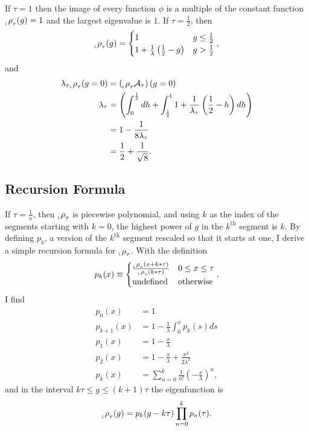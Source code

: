\documentclass[12pt]{article} \usepackage{amsmath,amsfonts}
\newcommand{\Aop}{{\cal A}}
\newcommand{\function}{\phi}
\newcommand{\leftfunction}{{_{_{\scalebox{.4}{L}}} \rho}}
\renewcommand{\th}{^{\text{th}}}
\begin{document}
If $\tau = 1$ then the image of every function $\function$ is a
multiple of the constant function $\leftfunction_\tau(g) = 1$ and the
largest eigenvalue is $1$.  If $\tau = \frac{1}{2}$, then
\begin{equation*}
  \leftfunction_\tau(g) =
  \begin{cases}
    1 & g \leq \frac{1}{2} \\
    1 + \frac{1}{\lambda}\left( \frac{1}{2} - g \right) & g > \frac{1}{2}
  \end{cases},
\end{equation*}
and
\begin{align*}
  \lambda_\tau \leftfunction_\tau (g=0) &= \left( \leftfunction_\tau
                                          \Aop_\tau \right) (g=0) \\ 
  \lambda_\tau &= \left( \int_0^{\frac{1}{2}} dh + \int_{\frac{1}{2}}^1
                1 + \frac{1}{\lambda_\tau}\left( \frac{1}{2} - h \right)
                dh \right) \\
  &= 1 - \frac{1}{8 \lambda_\tau} \\
              &= \frac{1}{2} + \frac{1}{\sqrt{8}}.
\end{align*}

\subsection{Recursion Formula}
\label{sec:recursion}

If $\tau = \frac{1}{n}$, then $\leftfunction_\tau$ is piecewise
polynomial, and using $k$ as the index of the segments starting with
$k=0$, the highest power of $g$ in the $k\th$ segment is $k$.  By
defining $p_k$, a version of the $k\th$ segment rescaled so that it
starts at one, I derive a simple recursion formula for
$\leftfunction_\tau$.  With the definition
\begin{equation}
  \label{eq:pk_def}
  p_k(x) \equiv
  \begin{cases}
    \frac{\leftfunction_\tau(x+k*\tau)} {\leftfunction_\tau(k*\tau)} &
    0 \leq x \leq \tau \\
    \text{undefined} & \text{otherwise}
  \end{cases},
\end{equation}
I find
\begin{align*}
  p_0(x) &= 1 \\
  p_{k+1}(x) &= 1 - \frac{1}{\lambda} \int_0^{x} p_k(s) ds \\
  p_1(x) &= 1 - \frac{x}{\lambda} \\
  p_2(x) &= 1 - \frac{x}{\lambda} + \frac{x^2}{2\lambda^2} \\
  p_k(x) &= \sum_{n=0}^k \frac{1}{n!} \left( -\frac{x}{\lambda}
           \right)^n,
\end{align*}
and in the interval $k\tau \leq g \leq (k+1)\tau$ the eigenfunction is
\begin{equation}
  \label{eq:eigenfunction}
  \leftfunction_\tau(g) = p_k(g-k\tau) \prod_{n=0}^k p_n(\tau).
\end{equation}
\end{document}
